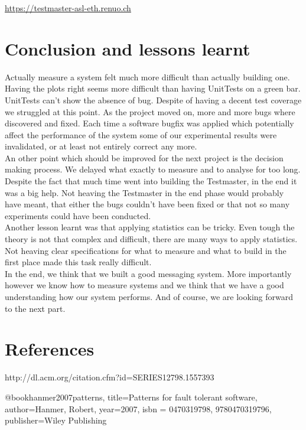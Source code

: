 \documentclass[a4paper]{article}
\begin{document}
\url{https://testmaster-asl-eth.renuo.ch}


\section{Conclusion and lessons learnt}

Actually measure a system felt much more difficult than actually building one. Having the plots right seems more difficult than having UnitTests on a green bar.\\

UnitTests can't show the absence of bug. Despite of having a decent test coverage we struggled at this point.  As the project moved on, more and more bugs where discovered and fixed. Each time a software bugfix was applied which potentially affect the performance of the system some of our experimental results were invalidated, or at least not entirely correct any more.\\

An other point which should be improved for the next project is the decision making process. We delayed what exactly to measure and to analyse for too long.\\

Despite the fact that much time went into building the Testmaster, in the end it was a big help. Not heaving the Testmaster in the end phase would probably have meant, that either the bugs couldn't have been fixed or that not so many experiments could have been conducted.\\

Another lesson learnt was that applying statistics can be tricky. Even tough the theory is not that complex and difficult, there are many ways to apply statistics. Not heaving clear specifications for what to measure and what to build in the first place made this task really difficult.\\

In the end, we think that we built a good messaging system. More importantly however we know how to measure systems and we think that we have a good understanding how our system performs. And of course, we are looking forward to the next part.

\section{References}


http://dl.acm.org/citation.cfm?id=SERIES12798.1557393

@book{hanmer2007patterns,
  title={Patterns for fault tolerant software},
  author={Hanmer, Robert},
  year={2007},
  isbn = {0470319798, 9780470319796},
  publisher={Wiley Publishing}
}

%
\end{document}

